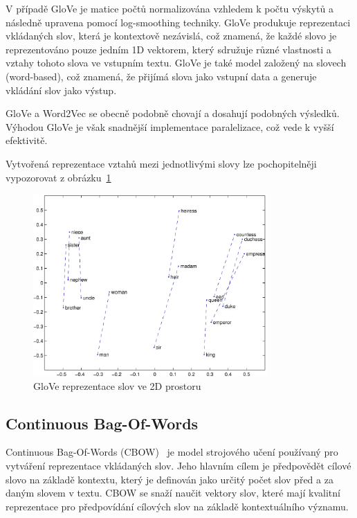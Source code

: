 V případě GloVe je matice počtů normalizována vzhledem k počtu výskytů a následně upravena pomocí log-smoothing techniky. GloVe produkuje reprezentaci vkládaných slov, která je kontextově nezávislá, což znamená, že každé slovo je reprezentováno pouze jedním 1D vektorem, který sdružuje různé vlastnosti a vztahy tohoto slova ve vstupním textu. GloVe je také model založený na slovech (word-based), což znamená, že přijímá slova jako vstupní data a generuje vkládání slov jako výstup.

GloVe a Word2Vec se obecně podobně chovají a dosahují podobných výsledků. Výhodou GloVe je však snadnější implementace paralelizace, což vede k vyšší efektivitě.

Vytvořená reprezentace vztahů mezi jednotlivými slovy lze pochopitelněji vypozorovat z obrázku~\ref{fig:GloVe reprezentace slov ve 2D prostoru} 
\begin{figure}[H]
	\centering
	\includegraphics[width=0.8\textwidth]{Figures/GloVe_representation.jpg}
	\caption{GloVe reprezentace slov ve 2D prostoru~\cite{link18}}\label{fig:GloVe reprezentace slov ve 2D prostoru}
\end{figure}

\subsection{Continuous Bag-Of-Words}
Continuous Bag-Of-Words (CBOW)~\cite{link12} je model strojového učení používaný pro vytváření reprezentace vkládaných slov.
Jeho hlavním cílem je předpovědět cílové slovo na základě kontextu, který je definován jako určitý počet slov před a za daným slovem v textu.
CBOW se snaží naučit vektory slov, které mají kvalitní reprezentace pro předpovídání cílových slov na základě kontextuálního významu.

